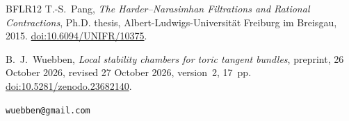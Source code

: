 \documentclass[11pt]{amsart}
\theoremstyle{definition}
\theoremstyle{remark}
\begin{document}
\begin{thebibliography}{BFLR12}
 T.-S.~Pang, \emph{The Harder--Narasimhan Filtrations and Rational Contractions}, Ph.D. thesis, Albert-Ludwigs-Universit\"at Freiburg im Breisgau, 2015. \href{https://doi.org/10.6094/UNIFR/10375}{doi:10.6094/UNIFR/10375}.

 B.~J.~Wuebben, \emph{Local stability chambers for toric tangent bundles}, preprint, 26 October 2026, revised 27 October 2026, version~2, 17~pp. \href{https://doi.org/10.5281/zenodo.23682140}{doi:10.5281/zenodo.23682140}.
\end{thebibliography}

\bigskip
{} \texttt{wuebben@gmail.com}
\end{document}
